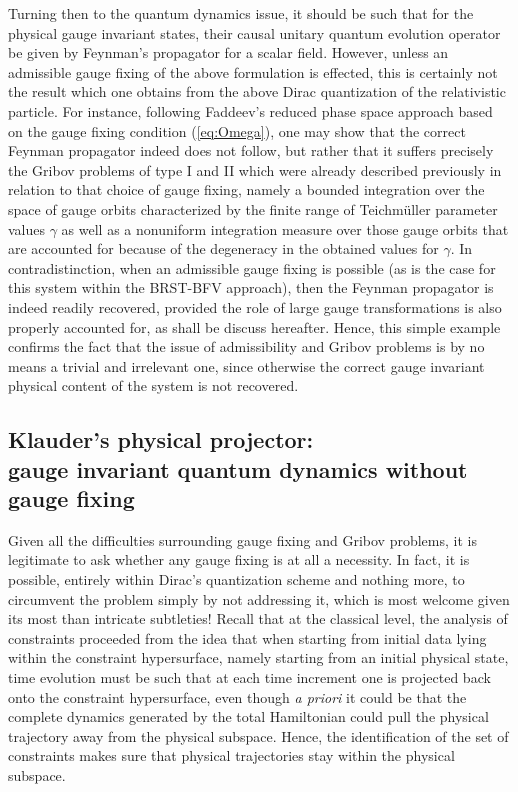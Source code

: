\documentclass[a4paper,11pt]{article}
\begin{document}
Turning then to the quantum dynamics issue, it should be such that for
the physical gauge invariant states, their causal unitary quantum evolution
operator be given by Feynman's propagator for a scalar field. However,
unless an admissible gauge fixing of the above formulation is effected,
this is certainly not the result which one obtains from the above Dirac
quantization of the relativistic particle. For instance, following
Faddeev's reduced phase space approach based on the gauge fixing
condition (\ref{eq:Omega}), one may show\cite{JG1,JG4,JG5} that the correct 
Feynman propagator
indeed does not follow, but rather that it suffers precisely the Gribov 
problems of type I and II which were already described previously in
relation to that choice of gauge fixing, namely a bounded integration over 
the space of gauge orbits characterized by the finite
range of Teichm\"uller parameter values $\gamma$ as well as a nonuniform
integration measure over those gauge orbits that are accounted for because
of the degeneracy in the obtained values for $\gamma$.
In contradistinction, when an admissible gauge fixing is possible
(as is the case for this system within the BRST-BFV 
approach\cite{JG1,JG4,JG5}), then the
Feynman propagator is indeed readily recovered, provided the role
of large gauge transformations is also properly accounted for, as shall
be discuss hereafter. Hence, this simple example confirms the fact that the
issue of admissibility and Gribov problems is by no means a trivial and
irrelevant one, since otherwise the correct gauge invariant physical
content of the system is not recovered.

\subsection{Klauder's physical projector:\\
gauge invariant quantum dynamics without gauge fixing}
\label{Subsect5.5}

Given all the difficulties surrounding gauge fixing and Gribov problems,
it is legitimate to ask whether any gauge fixing is at all a necessity.
In fact, it is possible, entirely within Dirac's quantization scheme
and nothing more, to circumvent the problem simply by not addressing it,
which is most welcome given its most than intricate subtleties! Recall
that at the classical level, the analysis of constraints proceeded from
the idea\cite{Klaud1} that when starting from initial data lying within the
constraint hypersurface, namely starting from an initial physical state,
time evolution must be such that at each time increment one is projected
back onto the constraint hypersurface, even though {\sl a priori\/} it could
be that the complete dynamics generated by the total Hamiltonian could
pull the physical trajectory away from the physical subspace. Hence,
the identification of the set of constraints makes sure that physical
trajectories stay within the physical subspace. 
\end{document}

